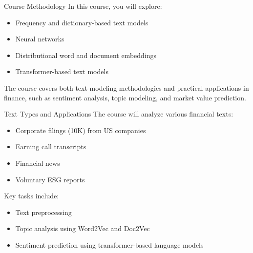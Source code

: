 \documentclass{beamer}
\begin{document}
	\begin{frame}{Course Methodology}
		In this course, you will explore:
		\begin{itemize}
			\item Frequency and dictionary-based text models
			\item Neural networks
			\item Distributional word and document embeddings
			\item Transformer-based text models
		\end{itemize}
		\vspace{0.3cm}
		The course covers both text modeling methodologies and practical applications in finance, such as sentiment analysis, topic modeling, and market value prediction.
	\end{frame}
	
	\begin{frame}{Text Types and Applications}
		The course will analyze various financial texts:
		\begin{itemize}
			\item Corporate filings (10K) from US companies
			\item Earning call transcripts
			\item Financial news
			\item Voluntary ESG reports
		\end{itemize}
		\vspace{0.3cm}
		Key tasks include:
		\begin{itemize}
			\item Text preprocessing
			\item Topic analysis using Word2Vec and Doc2Vec
			\item Sentiment prediction using transformer-based language models
		\end{itemize}
	\end{frame}	
	
\end{document}
